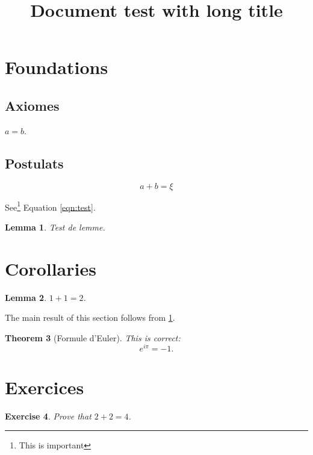 \documentclass[a4paper]{article}
\title{Document test with long title}
\newtheorem{theorem}{Theorem}[section]
\newtheorem{lem}[theorem]{Lemma}
\newtheorem{exo}[theorem]{Exercise}
\begin{document}
\section{Foundations}
\subsection{Axiomes}

$a = b$.

\subsection{Postulats}
\begin{equation}
\label{eqn:test}
a+b = ξ
\end{equation}

See\footnote{This is important} Equation \ref{eqn:test}.

\begin{lem}
	\label{lem1}
	Test de lemme.
\end{lem}

\section{Corollaries}

\begin{lem}
	\label{lem2}
	$1 + 1 = 2$.
\end{lem}

The main result of this section follows from \ref{lem1}.

\begin{theorem}[Formule d'Euler]
\label{thm1}
This is correct:
\[
	e^{i\pi} = -1.
\]
\end{theorem}

\section{Exercices}

\begin{exo}
  Prove that $2 + 2 = 4$.
\end{exo}
\end{document}
